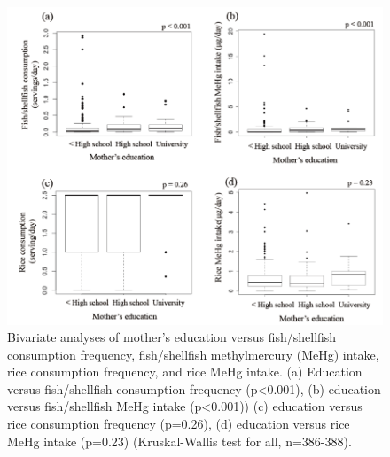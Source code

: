 \begin{figure}
  \centering
    \label{fig:Fig214}
  \includegraphics[scale=1]{Figures/Fig214.pdf}
  \caption[Bivariate analyses of mother's education versus fish/shellfish consumption frequency, fish/shellfish methylmercury intake, rice consumption frequency, and rice methylmercury intake]{Bivariate analyses of mother's education versus fish/shellfish consumption frequency, fish/shellfish methylmercury (MeHg) intake, rice consumption frequency, and rice MeHg intake. (a) Education versus fish/shellfish consumption frequency (p<0.001), (b) education versus fish/shellfish MeHg intake (p<0.001)) (c) education versus rice consumption frequency (p=0.26), (d) education versus rice MeHg intake (p=0.23) (Kruskal-Wallis test for all, n=386-388).}
\end{figure}


